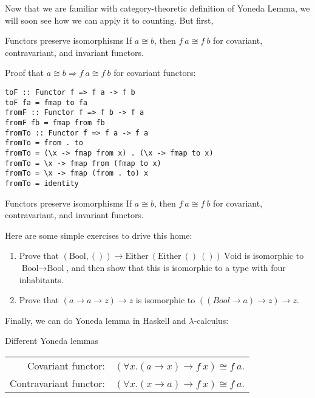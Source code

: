 \documentclass[tikz]{beamer}
\theoremstyle{definition}
\begin{document}
\begin{frame}
Now that we are familiar with category-theoretic definition of Yoneda Lemma, we will soon see how we can apply it to counting. But first,
\begin{block}{Functors preserve isomorphisms}
If $a \cong b$, then $f~a \cong f~b$ for covariant, contravariant, and invariant functors.
\end{block}
\end{frame}

\begin{frame}[fragile]
Proof that $a \cong b \Rightarrow f~a \cong f~b$ for covariant functors:
\begin{verbatim}
toF :: Functor f => f a -> f b
toF fa = fmap to fa
fromF :: Functor f => f b -> f a
fromF fb = fmap from fb
fromTo :: Functor f => f a -> f a
fromTo = from . to
fromTo = (\x -> fmap from x) . (\x -> fmap to x)
fromTo = \x -> fmap from (fmap to x)
fromTo = \x -> fmap (from . to) x
fromTo = identity
\end{verbatim}
\end{frame}

\begin{frame}{}
\begin{block}{Functors preserve isomorphisms}
If $a \cong b$, then $f~a \cong f~b$ for covariant, contravariant, and invariant functors.
\end{block}

Here are some simple exercises to drive this home:
\begin{enumerate}
    \item Prove that $(\text{Bool}, ()) \to \text{Either}~(\text{Either}~()~())~\text{Void}$ is isomorphic to $\text{Bool} \to \text{Bool}$, and then show that this is isomorphic to a type with four inhabitants.
    \item Prove that $(a \to a \to z) \to z$ is isomorphic to $((Bool \to a) \to z) \to z$.
\end{enumerate}
\end{frame}

\begin{frame}
Finally, we can do Yoneda lemma in Haskell and $\lambda$-calculus:

\begin{block}{Different Yoneda lemmas}
\begin{tabular}{rc}
Covariant functor:     & $(\forall x. (a \to x) \to f~x) \cong f~a$. \\
Contravariant functor: & $(\forall x. (x \to a) \to f~x) \cong f~a$.
\end{tabular}
\end{block}
\end{frame}
\end{document}
